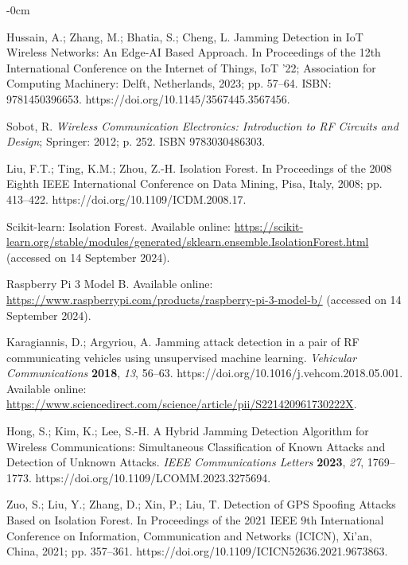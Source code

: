 \documentclass[futureinternet,article,submit,pdftex,moreauthors]{Definitions/mdpi}
\begin{document}
\begin{adjustwidth}{-\extralength}{0cm}
\begin{thebibliography}{999}
Hussain, A.; Zhang, M.; Bhatia, S.; Cheng, L. Jamming Detection in IoT Wireless Networks: An Edge-AI Based Approach. In Proceedings of the 12th International Conference on the Internet of Things, IoT ’22; Association for Computing Machinery: Delft, Netherlands, 2023; pp. 57--64. ISBN: 9781450396653. https://doi.org/10.1145/3567445.3567456.

Sobot, R. \textit{Wireless Communication Electronics: Introduction to RF Circuits and Design}; Springer: 2012; p. 252. ISBN 9783030486303.

Liu, F.T.; Ting, K.M.; Zhou, Z.-H. Isolation Forest. In Proceedings of the 2008 Eighth IEEE International Conference on Data Mining, Pisa, Italy, 2008; pp. 413--422. https://doi.org/10.1109/ICDM.2008.17.

Scikit-learn: Isolation Forest. Available online: \url{https://scikit-learn.org/stable/modules/generated/sklearn.ensemble.IsolationForest.html} (accessed on 14 September 2024).

Raspberry Pi 3 Model B. Available online: \url{https://www.raspberrypi.com/products/raspberry-pi-3-model-b/} (accessed on 14 September 2024).

Karagiannis, D.; Argyriou, A. Jamming attack detection in a pair of RF communicating vehicles using unsupervised machine learning. {\em Vehicular Communications} {\bf 2018}, {\em 13}, 56--63. https://doi.org/10.1016/j.vehcom.2018.05.001. Available online: \url{https://www.sciencedirect.com/science/article/pii/S221420961730222X}.

Hong, S.; Kim, K.; Lee, S.-H. A Hybrid Jamming Detection Algorithm for Wireless Communications: Simultaneous Classification of Known Attacks and Detection of Unknown Attacks. {\em IEEE Communications Letters} {\bf 2023}, {\em 27}, 1769--1773. https://doi.org/10.1109/LCOMM.2023.3275694.

Zuo, S.; Liu, Y.; Zhang, D.; Xin, P.; Liu, T. Detection of GPS Spoofing Attacks Based on Isolation Forest. In Proceedings of the 2021 IEEE 9th International Conference on Information, Communication and Networks (ICICN), Xi'an, China, 2021; pp. 357--361. https://doi.org/10.1109/ICICN52636.2021.9673863.



\end{thebibliography}
\end{adjustwidth}
\end{document}
